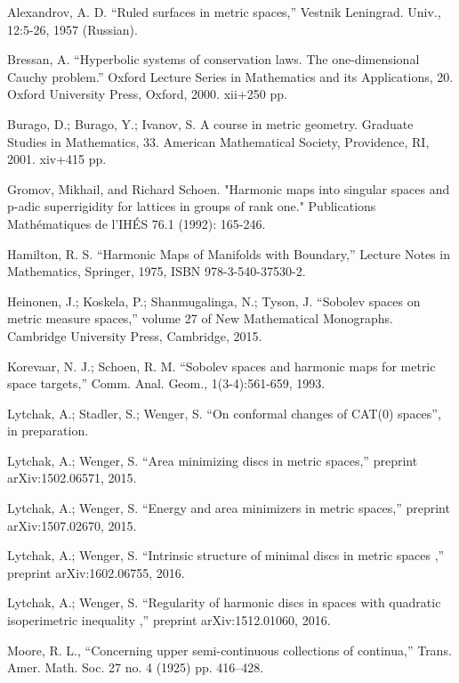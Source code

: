 \documentclass{article}
\begin{document}
\begin{thebibliography}{52}

 Alexandrov, A. D. ``Ruled  surfaces  in  metric  spaces,'' Vestnik Leningrad. Univ., 12:5-26, 1957 (Russian).

 Bressan, A.
``Hyperbolic systems of conservation laws.
The one-dimensional Cauchy problem.'' 
Oxford Lecture Series in Mathematics and its Applications, 20. 
Oxford University Press, Oxford, 2000. 
xii+250 pp.

Burago, D.; Burago, Y.; Ivanov, S.
A course in metric geometry.
Graduate Studies in Mathematics, 33. American Mathematical Society, Providence, RI, 2001. xiv+415 pp.

 Gromov, Mikhail, and Richard Schoen. "Harmonic maps into singular spaces and p-adic superrigidity for lattices in groups of rank one." Publications Mathématiques de l'IHÉS 76.1 (1992): 165-246.

 Hamilton, R. S. ``Harmonic Maps of Manifolds with Boundary,'' Lecture Notes in Mathematics, Springer, 1975, ISBN 978-3-540-37530-2.

 Heinonen, J.;  Koskela, P.;  Shanmugalinga, N.; Tyson, J. ``Sobolev spaces on metric measure spaces,''
volume 27 of New Mathematical Monographs. Cambridge University Press, Cambridge, 2015.

Korevaar, N. J.; Schoen, R. M. ``Sobolev spaces and harmonic maps for metric space targets,'' Comm. Anal. Geom., 1(3-4):561-659, 1993.

 Lytchak, A.; Stadler, S.; Wenger, S.  ``On conformal changes of CAT(0) spaces'', in preparation.

Lytchak, A.; Wenger, S. ``Area minimizing discs in metric spaces,'' preprint arXiv:1502.06571, 2015.

Lytchak, A.; Wenger, S. ``Energy and area minimizers in metric spaces,'' preprint  arXiv:1507.02670, 2015.

Lytchak, A.; Wenger, S. ``Intrinsic structure of minimal discs in metric spaces ,'' preprint  arXiv:1602.06755, 2016.

Lytchak, A.; Wenger, S. ``Regularity of harmonic discs in spaces with quadratic isoperimetric inequality  ,'' preprint  arXiv:1512.01060, 2016.

Moore, R. L.,
``Concerning upper semi-continuous collections of continua,''
Trans. Amer. Math. Soc. 27 no. 4 (1925) pp. 416--428.


\end{thebibliography}
\end{document}
